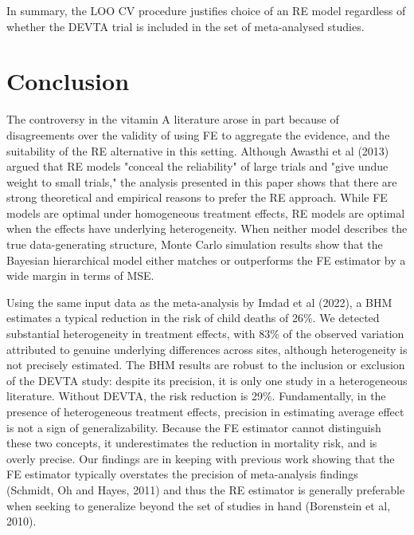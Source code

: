 \documentclass[12pt]{article}
\begin{document}
In summary, the LOO CV procedure justifies choice of an RE model regardless of whether the DEVTA trial is included in the set of meta-analysed studies.






\section{Conclusion}

The controversy in the vitamin A literature arose in part because of disagreements over the validity of using FE to aggregate the evidence, and the suitability of the RE alternative in this setting. Although Awasthi et al (2013) argued that RE models "conceal the reliability" of large trials and "give undue weight to small trials," the analysis presented in this paper shows that there are strong theoretical and empirical reasons to prefer the RE approach. While FE models are optimal under homogeneous treatment effects, RE models are optimal when the effects have underlying heterogeneity. When neither model describes the true data-generating structure, Monte Carlo simulation results show that the Bayesian hierarchical model either matches or outperforms the FE estimator by a wide margin in terms of MSE.

Using the same input data as the meta-analysis by Imdad et al (2022), a BHM estimates a typical reduction in the risk of child deaths of 26\%. 
We detected substantial heterogeneity in treatment effects, with 83\% of the observed variation attributed to genuine underlying differences across sites, although heterogeneity is not precisely estimated. The BHM results are robust to the inclusion or exclusion of the DEVTA study: despite its precision, it is only one study in a heterogeneous literature. Without DEVTA, the risk reduction is 29\%. 
Fundamentally, in the presence of heterogeneous treatment effects, precision in estimating average effect is not a sign of generalizability. 
Because the FE estimator cannot distinguish these two concepts, it underestimates the reduction in mortality risk, and is overly precise. 
Our findings are in keeping with previous work showing that the FE estimator typically overstates the precision of meta-analysis findings (Schmidt, Oh and Hayes, 2011) and thus the RE estimator is generally preferable when seeking to generalize beyond the set of studies in hand (Borenstein et al, 2010). 
\end{document}
